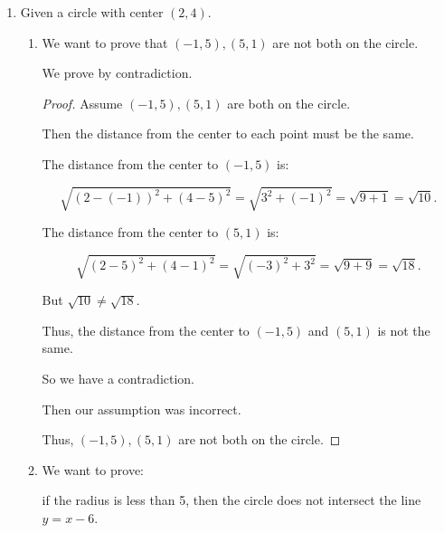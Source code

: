 \documentclass[12pt,letterpaper]{article}
\begin{document}
\begin{enumerate}
\begin{enumerate}
\begin{enumerate}
\begin{proof}
                Therefore, if $xy$ is even, then either $x$ or $y$ is even.
              \end{proof}
          \end{enumerate}
        \setcounter{enumii}{4}
        \item
          Given a circle with center $(2, 4)$.
          \begin{enumerate}
            \item
              We want to prove that $(-1, 5), (5, 1)$ are not both on the circle.

              We prove by contradiction.

              \begin{proof}
                Assume $(-1, 5), (5, 1)$ are both on the circle.

                Then the distance from the center to each point must be the same.

                The distance from the center to $(-1, 5)$ is:

                \[
                  \sqrt{\left(2 - (-1)\right)^2 + \left(4 - 5\right)^2}
                  =
                  \sqrt{3^2 + \left(-1\right)^2}
                  =
                  \sqrt{9 + 1}
                  =
                  \sqrt{10}.
                \]

                The distance from the center to $(5, 1)$ is:

                \[
                  \sqrt{\left(2 - 5\right)^2 + \left(4 - 1\right)^2}
                  =
                  \sqrt{\left(-3\right)^2 + 3^2}
                  =
                  \sqrt{9 + 9}
                  =
                  \sqrt{18}.
                \]

                But $\sqrt{10} \neq \sqrt{18}$.

                Thus, the distance from the center to $(-1, 5)$ and $(5, 1)$ is not the same.

                So we have a contradiction.

                Then our assumption was incorrect.

                Thus, $(-1, 5), (5, 1)$ are not both on the circle.
              \end{proof}
            \item
              We want to prove:

              if the radius is less than 5,
              then the circle does not intersect the line $y = x - 6$.


\end{enumerate}
\end{enumerate}
\end{enumerate}
\end{document}
